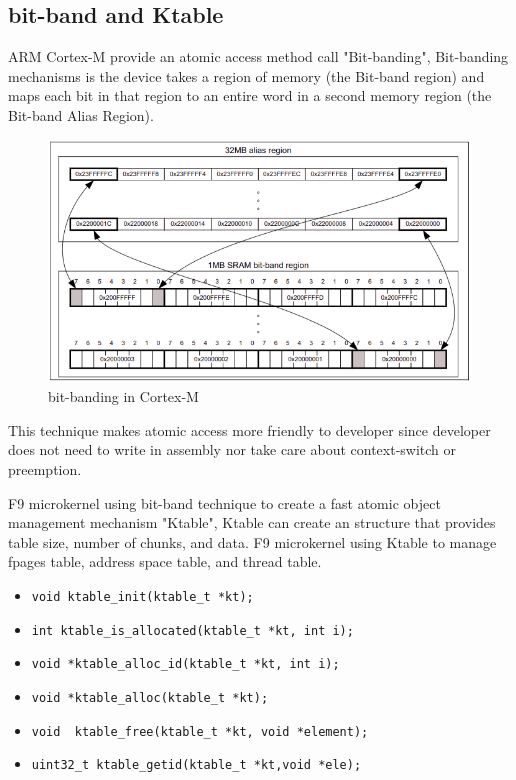 \documentclass[10pt,preprint,nocopyrightspace]{sigplanconf}
\begin{document}
\subsection{bit-band and Ktable}
ARM Cortex-M provide an atomic access method call "Bit-banding", Bit-banding mechanisms is the device takes a region of memory (the Bit-band region) and maps each bit in that region to an entire word in a second memory region (the Bit-band Alias Region).\cite{schaenzle2013}

\begin{figure}[H]
\begin{center}
	\includegraphics[width=\linewidth]{picture/bit-banding.png}
\end{center}
\caption{bit-banding in Cortex-M\cite{st2016manual}}
\end{figure}

This technique makes atomic access more friendly to developer since developer does not need to write in assembly nor take care about context-switch or preemption.

F9 microkernel using bit-band technique to create a fast atomic object management mechanism "Ktable", Ktable can create an structure that provides table size, number of chunks, and data. F9 microkernel using Ktable to manage fpages table, address space table, and thread table.

\begin{itemize}
\footnotesize
\item \verb|void ktable_init(ktable_t *kt);|
\item \verb|int ktable_is_allocated(ktable_t *kt, int i);|
\item \verb|void *ktable_alloc_id(ktable_t *kt, int i);|
\item \verb|void *ktable_alloc(ktable_t *kt);|
\item \verb|void  ktable_free(ktable_t *kt, void *element);|
\item \verb|uint32_t ktable_getid(ktable_t *kt,void *ele);|
\end{itemize}
\end{document}
